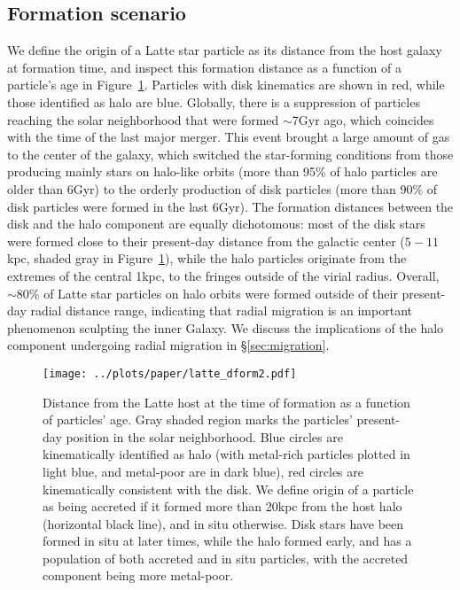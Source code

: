 \documentclass[apj, twocolappendix, numberedappendix, appendixfloats]{emulateapj}
\begin{document}
\subsection{Formation scenario}
We define the origin of a Latte star particle as its distance from the host galaxy at formation time, and inspect this formation distance as a function of a particle's age in Figure~\ref{fig:dform}.
Particles with disk kinematics are shown in red, while those identified as halo are blue.
Globally, there is a suppression of particles reaching the solar neighborhood that were formed $\sim$7\;Gyr ago, which coincides with the time of the last major merger.
This event brought a large amount of gas to the center of the galaxy, which switched the star-forming conditions from those producing mainly stars on halo-like orbits (more than 95\% of halo particles are older than 6\;Gyr) to the orderly production of disk particles (more than 90\% of disk particles were formed in the last 6\;Gyr).
The formation distances between the disk and the halo component are equally dichotomous: most of the disk stars were formed close to their present-day distance from the galactic center ($5-11$\;kpc, shaded gray in Figure~\ref{fig:dform}), while the halo particles originate from the extremes of the central 1\;kpc, to the fringes outside of the virial radius.
Overall, $\sim80$\% of Latte star particles on halo orbits were formed outside of their present-day radial distance range, indicating that radial migration is an important phenomenon sculpting the inner Galaxy.
We discuss the implications of the halo component undergoing radial migration in \S\ref{sec:migration}.

\begin{figure}
\begin{center}
\texttt{[image: ../plots/paper/latte\_dform2.pdf]}
\caption{Distance from the Latte host at the time of formation as a function of particles' age.
Gray shaded region marks the particles' present-day position in the solar neighborhood.
Blue circles are kinematically identified as halo (with metal-rich particles plotted in light blue, and metal-poor are in dark blue), red circles are kinematically consistent with the disk.
We define origin of a particle as being accreted if it formed more than 20\;kpc from the host halo (horizontal black line), and in situ otherwise.
Disk stars have been formed in situ at later times, while the halo formed early, and has a population of both accreted and in situ particles, with the accreted component being more metal-poor.}
\label{fig:dform}
\end{center}
\end{figure}
\end{document}
